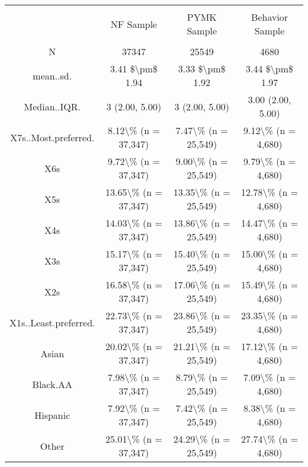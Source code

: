 
\begin{table}[!htbp] \centering 
  \caption{} 
  \label{} 
\begin{tabular}{@{\extracolsep{5pt}} cccc} 
\\[-1.8ex]\hline 
\hline \\[-1.8ex] 
 & NF Sample & PYMK Sample & Behavior Sample \\ 
\hline \\[-1.8ex] 
N & 37347 & 25549 & 4680 \\ 
mean..sd. & 3.41 \$\textbackslash pm\$ 1.94 & 3.33 \$\textbackslash pm\$ 1.92 & 3.44 \$\textbackslash pm\$ 1.97 \\ 
Median..IQR. & 3 (2.00, 5.00) & 3 (2.00, 5.00) & 3.00 (2.00, 5.00) \\ 
X7s..Most.preferred. & 8.12\textbackslash \% (n = 37,347) & 7.47\textbackslash \% (n = 25,549) & 9.12\textbackslash \% (n = 4,680) \\ 
X6s & 9.72\textbackslash \% (n = 37,347) & 9.00\textbackslash \% (n = 25,549) & 9.79\textbackslash \% (n = 4,680) \\ 
X5s & 13.65\textbackslash \% (n = 37,347) & 13.35\textbackslash \% (n = 25,549) & 12.78\textbackslash \% (n = 4,680) \\ 
X4s & 14.03\textbackslash \% (n = 37,347) & 13.86\textbackslash \% (n = 25,549) & 14.47\textbackslash \% (n = 4,680) \\ 
X3s & 15.17\textbackslash \% (n = 37,347) & 15.40\textbackslash \% (n = 25,549) & 15.00\textbackslash \% (n = 4,680) \\ 
X2s & 16.58\textbackslash \% (n = 37,347) & 17.06\textbackslash \% (n = 25,549) & 15.49\textbackslash \% (n = 4,680) \\ 
X1s..Least.preferred. & 22.73\textbackslash \% (n = 37,347) & 23.86\textbackslash \% (n = 25,549) & 23.35\textbackslash \% (n = 4,680) \\ 
Asian & 20.02\textbackslash \% (n = 37,347) & 21.21\textbackslash \% (n = 25,549) & 17.12\textbackslash \% (n = 4,680) \\ 
Black.AA & 7.98\textbackslash \% (n = 37,347) & 8.79\textbackslash \% (n = 25,549) & 7.09\textbackslash \% (n = 4,680) \\ 
Hispanic & 7.92\textbackslash \% (n = 37,347) & 7.42\textbackslash \% (n = 25,549) & 8.38\textbackslash \% (n = 4,680) \\ 
Other & 25.01\textbackslash \% (n = 37,347) & 24.29\textbackslash \% (n = 25,549) & 27.74\textbackslash \% (n = 4,680) \\ 

\end{tabular}
\end{table}
